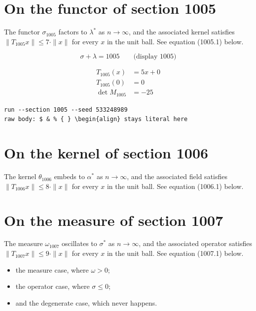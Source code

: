 \documentclass{article}
\begin{document}
\section{On the functor of section 1005}
The functor $\sigma_{1005}$ factors to $\lambda^{*}$ as $n \to \infty$,
and the associated kernel satisfies $\|T_{1005} x\| \leq 7 \cdot \|x\|$
for every $x$ in the unit ball. See equation (1005.1) below.

$$
\sigma + \lambda = 1005 \qquad \text{(display 1005)}
$$

\begin{align}
T_{1005}(x) &= 5 x + 0 \\
T_{1005}(0) &= 0 \\
\det M_{1005} &= -25
\end{align}

\begin{verbatim}
run --section 1005 --seed 533248989
raw body: $ & % { } \begin{align} stays literal here
\end{verbatim}

\section{On the kernel of section 1006}
The kernel $\theta_{1006}$ embeds to $\alpha^{*}$ as $n \to \infty$,
and the associated field satisfies $\|T_{1006} x\| \leq 8 \cdot \|x\|$
for every $x$ in the unit ball. See equation (1006.1) below.

\section{On the measure of section 1007}
The measure $\omega_{1007}$ oscillates to $\sigma^{*}$ as $n \to \infty$,
and the associated operator satisfies $\|T_{1007} x\| \leq 9 \cdot \|x\|$
for every $x$ in the unit ball. See equation (1007.1) below.

\begin{itemize}
  \item the measure case, where $\omega > 0$;
  \item the operator case, where $\sigma \leq 0$;
  \item and the degenerate case, which never happens.
\end{itemize}
\end{document}
